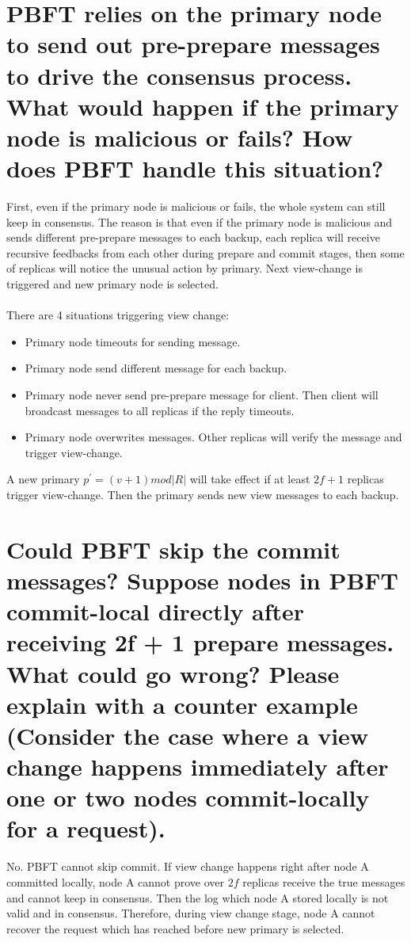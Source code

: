 \documentclass{article}
\begin{document}
\section{PBFT relies on the primary node to send out pre-prepare messages to drive the
consensus process. What would happen if the primary node is malicious or fails?
How does PBFT handle this situation?}
First, even if the primary node is malicious or fails, the whole system can still keep in consensus.
The reason is that even if the primary node is malicious 
and sends different pre-prepare messages to each backup,
each replica will receive recursive feedbacks from each other during prepare and commit stages,
then some of replicas will notice the unusual action by primary. Next view-change is triggered and new primary node is selected.\\\\
There are 4 situations triggering view change:
\begin{itemize}
    \item Primary node timeouts for sending message.
    \item Primary node send different message for each backup.
    \item Primary node never send pre-prepare message for client. Then client will broadcast messages to all replicas if the reply timeouts.
    \item Primary node overwrites messages. Other replicas will verify the message and trigger view-change.
\end{itemize}
A new primary $p^\prime = (v+1)mod|R|$ will take effect if at least $2f+1$ replicas trigger view-change. 
Then the primary sends new view messages to each backup.
\section{Could PBFT skip the commit messages? Suppose nodes in PBFT commit-local
directly after receiving 2f + 1 prepare messages. What could go wrong? Please
explain with a counter example (Consider the case where a view change happens
immediately after one or two nodes commit-locally for a request).}
No. PBFT cannot skip commit. If view change happens right after node A committed locally,
node A cannot prove over $2f$ replicas receive the true messages and cannot keep in consensus.
Then the log which node A stored locally is not valid and in consensus.
Therefore, during view change stage, node A cannot recover the request which has reached before new primary is selected.
\end{document}

